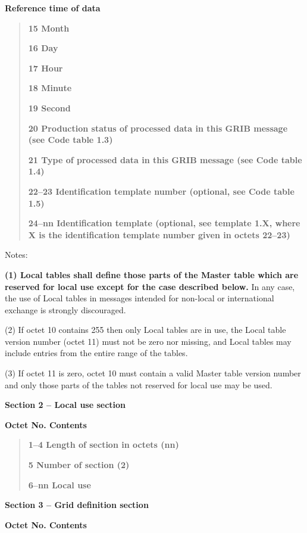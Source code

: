 \textbf{Reference time of data}

\begin{quote}
\textbf{15 Month}

\textbf{16 Day}

\textbf{17 Hour}

\textbf{18 Minute}

\textbf{19 Second}

\textbf{20 Production status of processed data in this GRIB message (see Code table 1.3)}

\textbf{21 Type of processed data in this GRIB message (see Code table 1.4)}

\textbf{22--23 Identification template number (optional, see Code table 1.5)}

\textbf{24--nn Identification template (optional, see template 1.X, where X is the identification template number given in octets 22--23)}
\end{quote}

Notes:

\textbf{(1) Local tables shall define those parts of the Master table which are reserved for local use except for the case described below.} In any case, the use of Local tables in messages intended for non-local or international exchange is strongly discouraged.

(2) If octet 10 contains 255 then only Local tables are in use, the Local table version number (octet 11) must not be zero nor missing, and Local tables may include entries from the entire range of the tables.

(3) If octet 11 is zero, octet 10 must contain a valid Master table version number and only those parts of the tables not reserved for local use may be used.

\textbf{Section 2 -- Local use section\\
}

\textbf{Octet No. Contents}

\begin{quote}
\textbf{1--4 Length of section in octets (nn)}

\textbf{5 Number of section (2)}

\textbf{6--nn Local use}
\end{quote}

\textbf{Section 3 -- Grid definition section\\
}

\textbf{Octet No. Contents}

